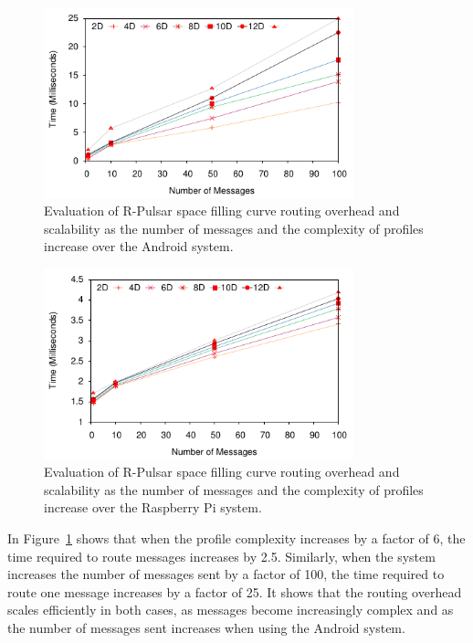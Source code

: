 \begin{figure}[h!]
  \centering
  \includegraphics[width=0.8\textwidth]{Results/Phone}
  \caption{Evaluation of R-Pulsar space filling curve routing overhead and scalability as the number of messages and the complexity of profiles increase over the Android system.}
  \label{fig:Phone}
\end{figure}

\begin{figure}[H]
  \centering
  \includegraphics[width=0.8\textwidth]{Results/Raspberry}
  \caption{Evaluation of R-Pulsar space filling curve routing overhead and scalability as the number of messages and the complexity of profiles increase over the Raspberry Pi system.}
  \label{fig:Raspberri}
\end{figure}

In Figure~\ref{fig:Phone} shows that when the profile complexity increases by a factor of 6, the time required to route messages increases by 2.5. Similarly, when the system increases the number of messages sent by a factor of 100, the time required to route one message increases by a factor of 25. It shows that the routing overhead scales efficiently in both cases, as messages become increasingly complex and as the number of messages sent increases when using the Android system. 

